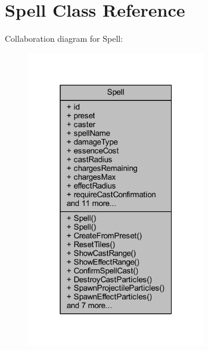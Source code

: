 \hypertarget{class_spell}{}\section{Spell Class Reference}
\label{class_spell}


Collaboration diagram for Spell\+:\nopagebreak
\begin{figure}[H]
\begin{center}
\leavevmode
\includegraphics[width=220pt]{class_spell__coll__graph}
\end{center}
\end{figure}
